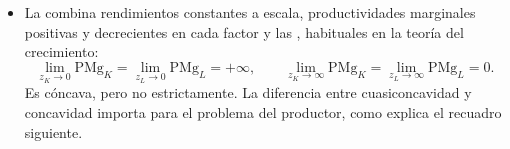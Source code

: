 \documentclass[11pt]{article}
\begin{document}
\begin{itemize}
\begin{itemize}
  \end{itemize}
\item La  combina rendimientos constantes a escala, productividades marginales positivas y decrecientes en cada factor y las \nocite{Inada1963Two}, habituales en la teoría del crecimiento:
  \begin{equation}
  \lim_{z_K\to 0}\mathrm{PMg}_K=\lim_{z_L\to 0}\mathrm{PMg}_L=+\infty,\qquad \lim_{z_K\to\infty}\mathrm{PMg}_K=\lim_{z_L\to\infty}\mathrm{PMg}_L=0. \label{eq:inada}
  \end{equation}
  Es cóncava, pero no estrictamente. La diferencia entre cuasiconcavidad y concavidad importa para el problema del productor, como explica el recuadro siguiente.
\end{itemize}
\end{document}
